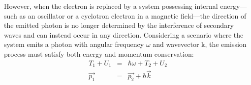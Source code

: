\documentclass{cpbtex3}
\begin{document}
However, when the electron is replaced by a system possessing internal energy---such as an oscillator or a cyclotron electron in a magnetic field---the direction of the emitted photon is no longer determined by the interference of secondary waves and can instead occur in any direction. Considering a scenario where the system emits a photon with angular frequency $\omega$ and wavevector k, the emission process must satisfy both energy and momentum conservation:
\begin{subequations}
\begin{eqnarray}
T_1+U_1&=&\hbar \omega +T_2+U_2  \label{Tc} \\  
 \vec{p_1}&=&\vec{p_2}+\hbar\vec{k}   \label{Pc}
\end{eqnarray}
\end{subequations}
\end{document}
